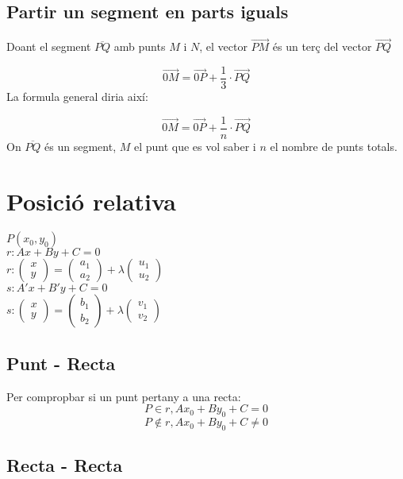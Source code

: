 \documentclass[12pt,a4paper]{article}
\begin{document}
\subsection{Partir un segment en parts iguals}

Doant el segment $\overline{PQ}$ amb punts $M$ i $N$,
el vector $\vec{PM}$ és un terç del vector $\vec{PQ}$

$$\vec{0M} = \vec{0P}+ \frac{1}{3} \cdot\vec{PQ}$$
La formula general diria així:

$$\vec{0M} = \vec{0P} + \frac{1}{n} \cdot \vec{PQ}$$
On $\overline{PQ}$ és un segment, $M$ el punt que es vol saber i $n$ el nombre de punts totals.

\section{Posició relativa}
$P(x_0, y_0)$\\
$r: Ax + By + C = 0$ \\[5pt]
$r: \begin{pmatrix}
    x \\
    y   
\end{pmatrix} = \begin{pmatrix}
    a_1 \\
    a_2
\end{pmatrix} + \lambda \begin{pmatrix}
    u_1 \\
    u_2
\end{pmatrix}$ \\[5pt]
$s: A'x + B'y +C = 0$\\[5pt]
$s: \begin{pmatrix}
    x \\
    y   
\end{pmatrix} = \begin{pmatrix}
    b_1 \\
    b_2
\end{pmatrix} + \lambda \begin{pmatrix}
    v_1 \\
    v_2
\end{pmatrix}$ \\
\subsection{Punt - Recta}
Per compropbar si un punt pertany a una recta:
$$P \in r, Ax_0 + By_0 + C = 0$$
$$P \notin r, Ax_0 + By_0 + C \neq 0$$

\subsection{Recta - Recta}
\end{document}
